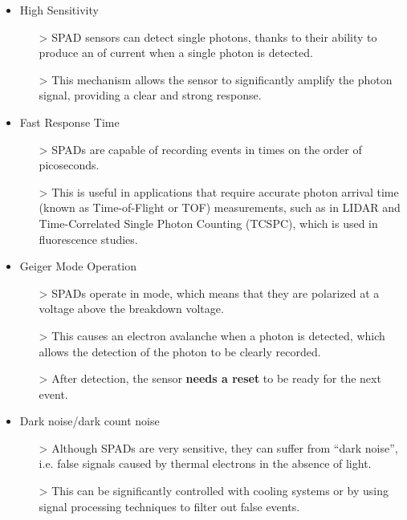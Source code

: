 \begin{itemize}
\item High Sensitivity
    \begin{itemize}
    \item[>] SPAD sensors can detect single photons, thanks to their ability to produce an  of current when a single photon is detected.
    \item[>] This mechanism allows the sensor to significantly amplify the photon signal, providing a clear and strong response.
    \end{itemize}
\item Fast Response Time
    \begin{itemize}
    \item[>] SPADs are capable of recording events in times on the order of picoseconds.
    \item[>] This is useful in applications that require accurate photon arrival time (known as Time-of-Flight or TOF) measurements, such as in LIDAR and Time-Correlated Single Photon Counting (TCSPC), which is used in fluorescence studies.
    \end{itemize}
\item Geiger Mode Operation
    \begin{itemize}
    \item[>] SPADs operate in  mode, which means that they are polarized at a voltage above the breakdown voltage. 
    \item[>] This causes an electron avalanche when a photon is detected, which allows the detection of the photon to be clearly recorded.
    \item[>] After detection, the sensor \textbf{needs a reset} to be ready for the next event.
    \end{itemize}
\item Dark noise/dark count noise
    \begin{itemize}
    \item[>] Although SPADs are very sensitive, they can suffer from “dark noise”, i.e. false signals caused by thermal electrons in the absence of light. 
    \item[>] This can be significantly controlled with cooling systems or by using signal processing techniques to filter out false events.
    \end{itemize}
\end{itemize}

\vspace{5 mm}

